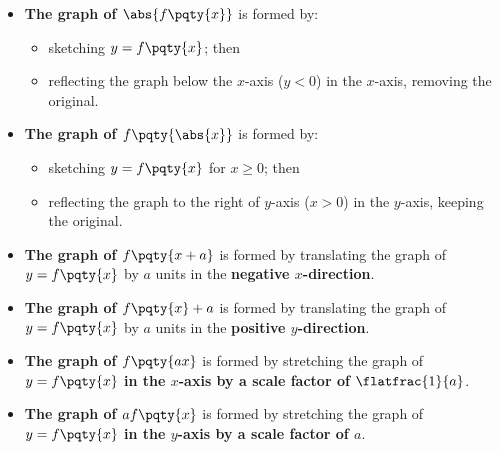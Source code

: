 \documentclass{article}
\begin{document}
\begin{itemize}
    \item \textbf{The graph of \(\abs{f\pqty{x}}\)} is formed by:
        \begin{itemize}
            \item sketching \(y = f\pqty{x}\); then
            \item reflecting the graph below the \(x\)-axis (\(y < 0\)) in the \(x\)-axis, removing the original.
        \end{itemize}

    \item \textbf{The graph of \(f\pqty{\abs{x}}\)} is formed by:
        \begin{itemize}
            \item sketching \(y = f\pqty{x}\) for \(x \geq 0\); then
            \item reflecting the graph to the right of \(y\)-axis (\(x > 0\)) in the \(y\)-axis, keeping the original.
        \end{itemize}

    \item \textbf{The graph of \(f\pqty{x + a}\)} is formed by translating the graph of \(y = f\pqty{x}\) by \(a\) units in the \textbf{negative \(x\)-direction}.
    \item \textbf{The graph of \(f\pqty{x} + a\)} is formed by translating the graph of \(y = f\pqty{x}\) by \(a\) units in the \textbf{positive \(y\)-direction}.
    \item \textbf{The graph of \(f\pqty{ax}\)} is formed by stretching the graph of \(y = f\pqty{x}\) \textbf{in the \(x\)-axis by a scale factor of \(\flatfrac{1}{a}\)}.
    \item \textbf{The graph of \(a f\pqty{x}\)} is formed by stretching the graph of \(y = f\pqty{x}\) \textbf{in the \(y\)-axis by a scale factor of \(a\)}.
        
\end{itemize}
\end{document}
